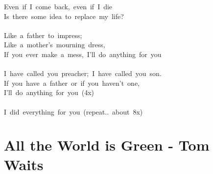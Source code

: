 \documentclass[]{book}
\let\stdsection\section
\renewcommand\section{\clearpage\stdsection}
\begin{document}
Even~if~I~come~back,~even~if~I~die~\\
Is~there~some~idea~to~replace~my~life?~\\
~\\
Like~a~father~to~impress;~\\
Like~a~mother's~mourning~dress,~\\
If~you~ever~make~a~mess,~I'll~do~anything~for~you~\\
~\\
I~have~called~you~preacher;~I~have~called~you~son.~\\
If~you~have~a~father~or~if~you~haven't~one,~\\
I'll~do~anything~for~you~(4x)\\
~\\
I~did~everything~for~you~(repeat..~about~8x)\\

\hypertarget{all-the-world-is-green---tom-waits}{%
\section{All the World is Green - Tom Waits}\label{all-the-world-is-green---tom-waits}}
\end{document}
